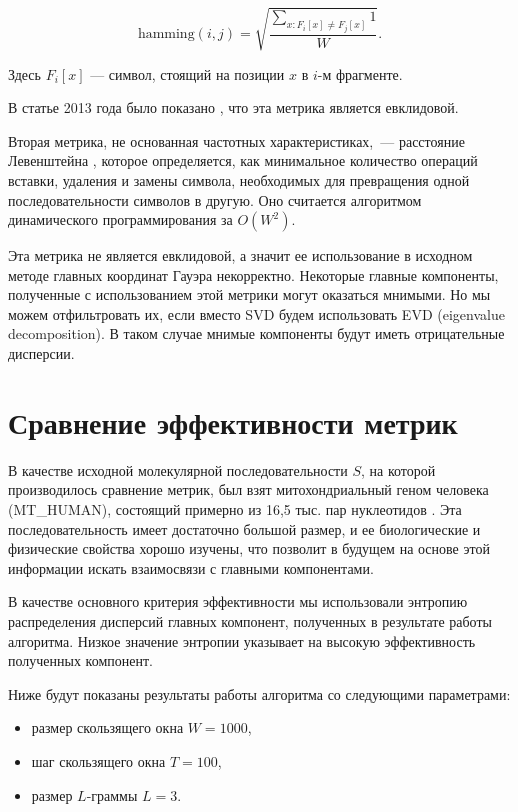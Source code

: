 $$\text{hamming}(i, j) = \sqrt{\frac{\sum_{x: F_i[x]\neq F_j[x]} 1}{W}}.$$

Здесь $F_i[x]$ --- символ, стоящий на позиции $x$ в $i$-м фрагменте.

В статье 2013 года было показано \cite{Efimov2013}, что эта метрика является евклидовой.

Вторая метрика, не основанная частотных характеристиках,~--- расстояние Левенштейна \cite{levenshtein1965}, которое определяется, как минимальное количество операций вставки, удаления и замены символа, необходимых для превращения одной последовательности символов в другую. Оно считается алгоритмом динамического программирования за $O(W^2)$.

Эта метрика не является евклидовой, а значит ее использование в исходном методе главных координат Гауэра некорректно. Некоторые главные компоненты, полученные с использованием этой метрики могут оказаться мнимыми. Но мы можем отфильтровать их, если вместо SVD будем использовать EVD (eigenvalue decomposition). В таком случае мнимые компоненты будут иметь отрицательные дисперсии.

\section{Сравнение эффективности метрик}

В качестве исходной молекулярной последовательности $S$, на которой производилось сравнение метрик, был взят митохондриальный геном человека (MT\_HUMAN), состоящий примерно из 16,5 тыс. пар нуклеотидов \cite{Anderson1981}. Эта последовательность имеет достаточно большой размер, и ее биологические и физические свойства хорошо изучены, что позволит в будущем на основе этой информации искать взаимосвязи с главными компонентами.

В качестве основного критерия эффективности мы использовали энтропию распределения дисперсий главных компонент, полученных в результате работы алгоритма. Низкое значение энтропии указывает на высокую эффективность полученных компонент.

Ниже будут показаны результаты работы алгоритма со следующими параметрами:
\begin{itemize}
  \item размер скользящего окна $W = 1000$,
  \item шаг скользящего окна $T = 100$,
  \item размер $L$-граммы $L = 3$.
\end{itemize}

